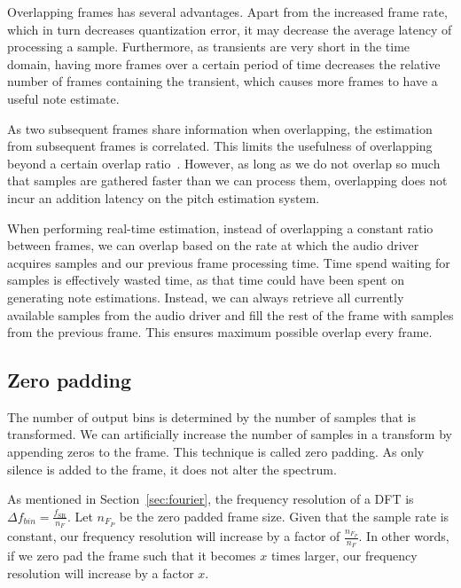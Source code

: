 \documentclass[a4paper,10pt,twocolumn]{article}
\begin{document}
Overlapping frames has several advantages. Apart from the increased frame rate, which in turn decreases quantization error, it may decrease the average latency of processing a sample. Furthermore, as transients are very short in the time domain, having more frames over a certain period of time decreases the relative number of frames containing the transient, which causes more frames to have a useful note estimate.%

As two subsequent frames share information when overlapping, the estimation from subsequent frames is correlated. This limits the usefulness of overlapping beyond a certain overlap ratio~\cite{overlap}. However, as long as we do not overlap so much that samples are gathered faster than we can process them, overlapping does not incur an addition latency on the pitch estimation system.

When performing real-time estimation, instead of overlapping a constant ratio between frames, we can overlap based on the rate at which the audio driver acquires samples and our previous frame processing time. Time spend waiting for samples is effectively wasted time, as that time could have been spent on generating note estimations. Instead, we can always retrieve all currently available samples from the audio driver and fill the rest of the frame with samples from the previous frame. This ensures maximum possible overlap every frame.


\subsection{Zero padding}  \label{sec:zeropadding}
The number of output bins is determined by the number of samples that is transformed. We can artificially increase the number of samples in a transform by appending zeros to the frame. This technique is called zero padding. As only silence is added to the frame, it does not alter the spectrum.

As mentioned in Section~\ref{sec:fourier}, the frequency resolution of a DFT is $\Delta f_{bin} = \frac{f_{\text{SR}}}{n_F}$. Let $n_{F_P}$ be the zero padded frame size. Given that the sample rate is constant, our frequency resolution will increase by a factor of $\frac{n_{F_P}}{n_F}$. In other words, if we zero pad the frame such that it becomes $x$ times larger, our frequency resolution will increase by a factor $x$.
\end{document}
